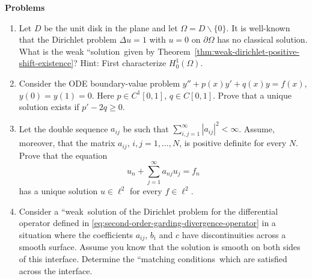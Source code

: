 \textbf{Problems}

\begin{enumerate}[label=\thesection.\arabic*.,ref=\thesection.\arabic*,start=1,series=book-problems]

\item\label{ex:punctured-disk-dirichlet-weak-solution} Let $D$ be the unit disk in the plane and let $\Omega=D\backslash\{0\}$. It is well-known that the Dirichlet problem $\Delta u=1$ with $u=0$ on $\partial\Omega$ has no classical solution. What is the weak ``solution\textquotesingle\textquotesingle\ given by Theorem~\ref{thm:weak-dirichlet-positive-shift-existence}? Hint: First characterize $H_0^1(\Omega)$.

\item\label{ex:ode-coercive-dirichlet-uniqueness} Consider the ODE boundary-value problem $y''+p(x)y'+q(x)y=f(x)$, $y(0)=y(1)=0$. Here $p\in C^1[0,1]$, $q\in C[0,1]$. Prove that a unique solution exists if $p'-2q\geq0$.

\item\label{ex:positive-double-sequence-l2-solvability} Let the double sequence $a_{ij}$ be such that $\sum_{i,j=1}^\infty|a_{ij}|^2<\infty$. Assume, moreover, that the matrix $a_{ij}$, $i,j=1,\ldots,N$, is positive definite for every $N$. Prove that the equation
\begin{equation}\label{eq:positive-double-sequence-l2-system-problem}
u_n+\sum_{j=1}^\infty a_{nj}u_j=f_n
\end{equation}
has a unique solution $u\in\ell^2$ for every $f\in\ell^2$.

\item\label{ex:discontinuous-coefficient-interface-matching} Consider a ``weak\textquotesingle\textquotesingle\ solution of the Dirichlet problem for the differential operator defined in \eqref{eq:second-order-garding-divergence-operator} in a situation where the coefficients $a_{ij}$, $b_i$ and $c$ have discontinuities across a smooth surface. Assume you know that the solution is smooth on both sides of this interface. Determine the ``matching conditions\textquotesingle\textquotesingle\ which are satisfied across the interface.

\end{enumerate}

